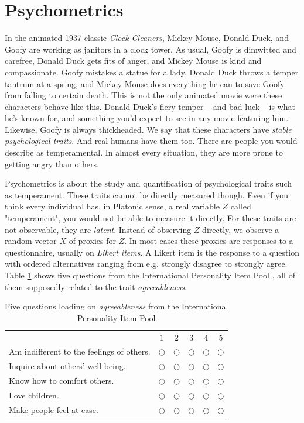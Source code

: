 
\section{Psychometrics}
In the animated 1937 classic \textit{Clock Cleaners}, Mickey Mouse, Donald Duck, and Goofy are working as janitors in a clock tower. As usual, Goofy is dimwitted and carefree, Donald Duck gets fits of anger, and Mickey Mouse is kind and compassionate. Goofy mistakes a statue for a lady, Donald Duck throws a temper tantrum at a spring, and Mickey Mouse does everything he can to save Goofy from falling to certain death. This is not the only animated movie were these characters behave like this. Donald Duck's fiery temper -- and bad luck -- is what he's known for, and something you'd expect to see in any movie featuring him. Likewise, Goofy is always thickheaded. We say that these characters have \textit{stable psychological traits}. And real humans have them too. There are people you would describe as temperamental. In almost every situation, they are more prone to getting angry than others.

Psychometrics is about the study and quantification of psychological traits such as temperament. These traits cannot be directly measured though. Even if you think every individual has, in Platonic sense, a real variable $Z$ called "temperament", you would not be able to measure it directly. For these traits are not observable, they are \textit{latent}. Instead of observing $Z$ directly, we observe a random vector $X$ of proxies for $Z$. In most cases these proxies are responses to a questionnaire, usually on \emph{Likert items}. A Likert item is the response to a question with ordered alternatives ranging from e.g. strongly disagree to strongly agree. Table \ref{tab:IPIP} shows five questions from the International Personality Item Pool \parencite{Goldberg1992-hp}, all of them supposedly related to the trait \textit{agreeableness}.

\begin{table}
\caption{\label{tab:IPIP}Five questions loading on \textit{agreeableness} from the International Personality Item Pool}
\noindent \begin{centering}
\begin{tabular}{lccccc}
 & $1$ & $2$ & $3$ & $4$ & $5$\tabularnewline
Am indifferent to the feelings of others.  & $\bigcirc$ & $\bigcirc$ & $\bigcirc$ & $\bigcirc$ & $\bigcirc$\tabularnewline
Inquire about others' well-being. & $\bigcirc$ & $\bigcirc$ & $\bigcirc$ & $\bigcirc$ & $\bigcirc$\tabularnewline
Know how to comfort others. & $\bigcirc$ & $\bigcirc$ & $\bigcirc$ & $\bigcirc$ & $\bigcirc$\tabularnewline
Love children. & $\bigcirc$ & $\bigcirc$ & $\bigcirc$ & $\bigcirc$ & $\bigcirc$\tabularnewline
Make people feel at ease.  & $\bigcirc$ & $\bigcirc$ & $\bigcirc$ & $\bigcirc$ & $\bigcirc$\tabularnewline
\end{tabular}
\par\end{centering}
\vskip7.0pt
\noindent {}
\end{table}

